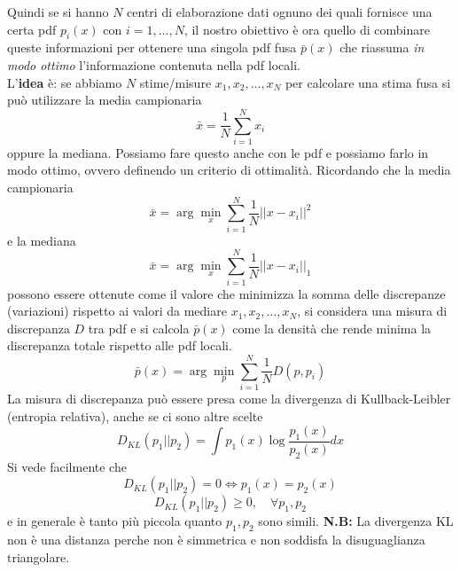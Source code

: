 Quindi se si hanno $N$ centri di elaborazione dati ognuno dei quali fornisce  una certa pdf $p_i(x)$ con $i=1,\dots, N$, il nostro obiettivo \`e ora quello di combinare queste informazioni per ottenere una singola pdf fusa $\bar{p}(x)$ che riassuma \textit{in modo ottimo} l'informazione contenuta nella pdf locali.\\
L'\textbf{idea} \`e: se abbiamo $N$ stime/misure $x_1, x_2, \dots, x_N$ per calcolare una stima fusa si pu\`o utilizzare la media campionaria
\begin{equation}
\bar{x} = \frac{1}{N} \sum_{i=1}^N x_i
\end{equation}
oppure la mediana. Possiamo fare questo anche con le pdf e possiamo farlo in modo ottimo, ovvero definendo un criterio di ottimalit\`a. Ricordando che la media campionaria 
\begin{equation}
\bar{x} = \arg \min_x \sum_{i=1}^N \frac{1}{N} ||x - x_i||^2
\end{equation} e la mediana
\begin{equation}
\bar{x} = \arg \min_x \sum_{i=1}^N \frac{1}{N} ||x - x_i||_1
\end{equation} possono essere ottenute come il valore che minimizza la somma delle discrepanze (variazioni) rispetto ai valori da mediare $x_1, x_2, \dots, x_N$, si considera una misura di discrepanza $D$ tra pdf e si calcola $\bar{p}(x)$ come la densit\`a che rende minima la discrepanza totale rispetto alle pdf locali.
\begin{equation}
\bar{p}(x) = \arg \min_p \sum_{i=1}^N \frac{1}{N} D ( p, p_i )
\end{equation} La misura di discrepanza pu\`o essere presa come la divergenza di Kullback-Leibler (entropia relativa), anche se ci sono altre scelte
\begin{equation}
D_{KL}(p_1 || p_2) = \int p_1(x) \log \frac{p_1(x)}{p_2(x)} dx
\end{equation} Si vede facilmente che
\begin{equation}
D_{KL} (p_1 || p_2) = 0 \iff p_1(x) = p_2(x)
\end{equation} \begin{equation}
D_{KL} (p_1 || p_2) \geq 0, \quad \forall p_1, p_2
\end{equation} e in generale \`e tanto pi\`u piccola quanto $p_1, p_2$ sono simili. 
\textbf{N.B:} La divergenza KL non \`e una distanza perche non \`e simmetrica e non soddisfa la disuguaglianza triangolare.


